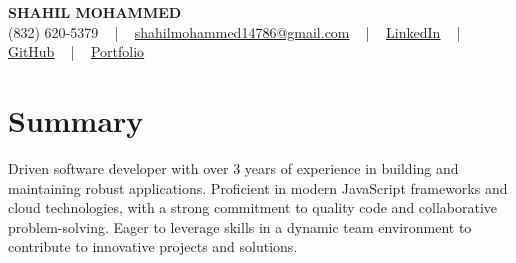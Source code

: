 \documentclass[letterpaper,10pt]{article}
\begin{document}
\begin{center}
    {\fontsize{14pt}{12pt}\selectfont \textbf{\MakeUppercase{Shahil Mohammed}}}\\ \vspace{2pt}
    \fontsize{10pt}{12pt}\selectfont (832) 620-5379 ~ | ~ \href{mailto:shahilmohammed14786@gmail.com}{shahilmohammed14786@gmail.com} ~ | ~  
    \href{https://www.linkedin.com/in/shahil-mohammed-9652931a1/}{\color{blue}\underline{LinkedIn}}  ~ | ~ 
    \href{https://github.com/freakbeast14}{\color{blue}\underline{GitHub}} ~ | ~ 
    \href{https://shahil-mohammed.netlify.app/}{\color{blue}\underline{Portfolio}}
    \vspace{-8pt}
\end{center}

\section{Summary}
\vspace{-2pt}\fontsize{8pt}{9pt}\selectfont
Driven software developer with over 3 years of experience in building and maintaining robust applications. Proficient in modern JavaScript frameworks and cloud technologies, with a strong commitment to quality code and collaborative problem-solving. Eager to leverage skills in a dynamic team environment to contribute to innovative projects and solutions.
\vspace{-5pt}

\vspace{-2pt}
\end{document}
